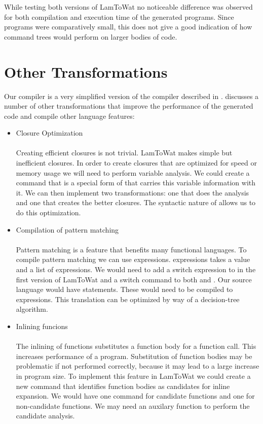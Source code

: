 While testing both versions of LamToWat no noticeable difference was observed for both compilation and execution time of the generated programs. Since programs were comparatively small, this does not give a good indication of how command trees would perform on larger bodies of code.

\section{\label{section:othert}Other Transformations}
Our compiler is a very simplified version of the compiler described in  \autocite{DBLP:books/daglib/0022396}. \citeauthor{DBLP:books/daglib/0022396} discusses a number of other transformations that improve the performance of the generated code and compile other language features:

\begin{itemize}
\item Closure Optimization\\\\
Creating efficient closures is not trivial. LamToWat makes simple but inefficient closures. In order to create closures that are optimized for speed or memory usage we will need to perform variable analysis. We could create a command that is a special form of  that carries this variable information with it. We can then implement two transformations: one that does the analysis and one that creates the better closures. The syntactic nature of  allows us to do this optimization.
\item Compilation of pattern matching\\\\
Pattern matching is a feature that benefits many functional languages. To compile pattern matching we can use  expressions.  expressions takes a value and a list of expressions. We would need to add a switch expression to  in the first version of LamToWat and a switch command to both  and . Our source language would have  statements. These would need to be compiled to  expressions. This translation can be optimized by way of a decision-tree algorithm.
\item Inlining funcions\\\\
The inlining of functions substitutes a function body for a function call. This increases performance of a program. Substitution of function bodies may be problematic if not performed correctly, because it may lead to a large increase in program size. To implement this feature in LamToWat we could create a new command that identifies function bodies as candidates for inline expansion. We would have one command for candidate functions and one for non-candidate functions. We may need an auxilary function to perform the candidate analysis.
\end{itemize}
